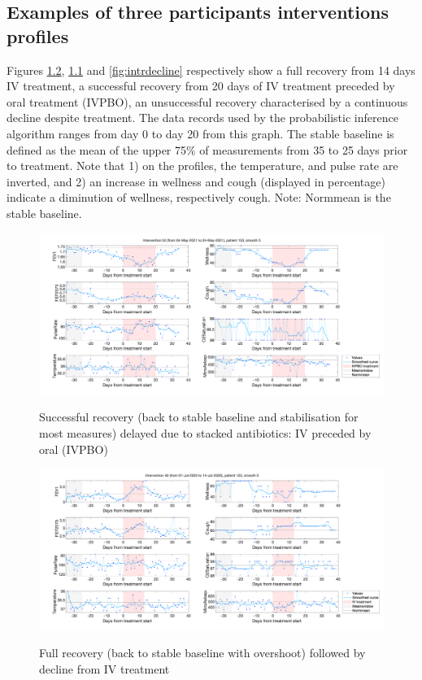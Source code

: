 \begin{appendices}
\chapter{Examples of three participants interventions profiles} \label{sec:appendixint}
Figures \ref{fig:intrfull}, \ref{fig:intrivpbo} and \ref{fig:intrdecline} respectively show a full recovery from 14 days IV treatment, a successful recovery from 20 days of IV treatment preceded by oral treatment (IVPBO), an unsuccessful recovery characterised by a continuous decline despite treatment. The data records used by the probabilistic inference algorithm ranges from day 0 to day 20 from this graph. The stable baseline is defined as the mean of the upper 75\% of measurements from 35 to 25 days prior to treatment. Note that 1) on the profiles, the temperature, and pulse rate are inverted, and 2) an increase in wellness and cough (displayed in percentage) indicate a diminution of wellness, respectively cough. Note: Normmean is the stable baseline.
    
    \begin{figure}[!h]
    \caption{Successful recovery (back to stable baseline and stabilisation for most measures) delayed due to stacked antibiotics: IV preceded by oral (IVPBO)}
    \centering
    \includegraphics[width=150mm]{images/Intervention52_ID133.png}
    \label{fig:intrivpbo}
    \end{figure}
    
    \begin{figure}[!h]
    \caption{Full recovery (back to stable baseline with overshoot) followed by decline from IV treatment}
    \centering
    \includegraphics[width=150mm]{images/Intervention40_ID123.png}
    \label{fig:intrfull}
    \end{figure}
    

\end{appendices}
